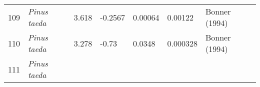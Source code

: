 \documentclass[]{article}
\begin{document}
\begin{longtable}[]{@{}lllllll@{}}
\begin{minipage}[t]{0.05\columnwidth}
109\strut
\end{minipage} & \begin{minipage}[t]{0.23\columnwidth}\raggedright
\emph{Pinus taeda}\strut
\end{minipage} & \begin{minipage}[t]{0.05\columnwidth}\raggedright
3.618\strut
\end{minipage} & \begin{minipage}[t]{0.08\columnwidth}\raggedright
-0.2567\strut
\end{minipage} & \begin{minipage}[t]{0.08\columnwidth}\raggedright
0.00064\strut
\end{minipage} & \begin{minipage}[t]{0.08\columnwidth}\raggedright
0.00122\strut
\end{minipage} & \begin{minipage}[t]{0.23\columnwidth}\raggedright
Bonner (1994)\strut
\end{minipage}\tabularnewline
\begin{minipage}[t]{0.05\columnwidth}\raggedright
110\strut
\end{minipage} & \begin{minipage}[t]{0.23\columnwidth}\raggedright
\emph{Pinus taeda}\strut
\end{minipage} & \begin{minipage}[t]{0.05\columnwidth}\raggedright
3.278\strut
\end{minipage} & \begin{minipage}[t]{0.08\columnwidth}\raggedright
-0.73\strut
\end{minipage} & \begin{minipage}[t]{0.08\columnwidth}\raggedright
0.0348\strut
\end{minipage} & \begin{minipage}[t]{0.08\columnwidth}\raggedright
0.000328\strut
\end{minipage} & \begin{minipage}[t]{0.23\columnwidth}\raggedright
Bonner (1994)\strut
\end{minipage}\tabularnewline
\begin{minipage}[t]{0.05\columnwidth}\raggedright
111\strut
\end{minipage} & \begin{minipage}[t]{0.23\columnwidth}\raggedright
\emph{Pinus taeda}\strut
\end{minipage} & \begin{minipage}[t]{0.05\columnwidth}\raggedright

\end{minipage}
\end{longtable}
\end{document}
